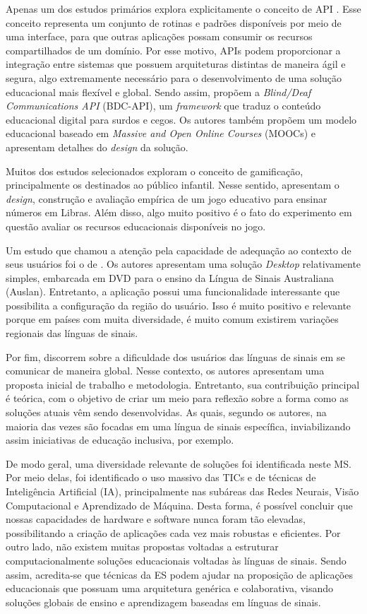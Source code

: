 Apenas um dos estudos primários explora explicitamente o conceito de API \cite{INT56}. Esse conceito representa um conjunto de rotinas e padrões disponíveis por meio de uma interface, para que outras aplicações possam consumir os recursos compartilhados de um domínio. Por esse motivo, APIs podem proporcionar a integração entre sistemas que possuem arquiteturas distintas de maneira ágil e segura, algo extremamente necessário para o desenvolvimento de uma solução educacional mais flexível e global. Sendo assim,  propõem a \textit{Blind/Deaf Communications API} (BDC-API), um \textit{framework} que traduz o conteúdo educacional digital para surdos e cegos. Os autores também propõem um modelo educacional baseado em \textit{Massive and Open Online Courses} (MOOCs) e apresentam detalhes do \textit{design} da solução.

Muitos dos estudos selecionados exploram o conceito de gamificação, principalmente os destinados ao público infantil. Nesse sentido,  apresentam o \textit{design}, construção e avaliação empírica de um jogo educativo para ensinar números em Libras. Além disso, algo muito positivo é o fato do experimento em questão avaliar os recursos educacionais disponíveis no jogo.

Um estudo que chamou a atenção pela capacidade de adequação ao contexto de seus usuários foi o de . Os autores apresentam uma solução \textit{Desktop} relativamente simples, embarcada em DVD para o ensino da Língua de Sinais Australiana (Auslan). Entretanto, a aplicação possui uma funcionalidade interessante que possibilita a configuração da região do usuário. Isso é muito positivo e relevante porque em países com muita diversidade, é muito comum existirem variações regionais das línguas de sinais.

Por fim,  discorrem sobre a dificuldade dos usuários das línguas de sinais em se comunicar de maneira global. Nesse contexto, os autores apresentam uma proposta inicial de trabalho e metodologia. Entretanto, sua contribuição principal é teórica, com o objetivo de criar um meio para reflexão sobre a forma como as soluções atuais vêm sendo desenvolvidas. As quais, segundo os autores, na maioria das vezes são focadas em uma língua de sinais específica, inviabilizando assim iniciativas de educação inclusiva, por exemplo.

De modo geral, uma diversidade relevante de soluções foi identificada neste MS. Por meio delas, foi identificado o uso massivo das TICs e de técnicas de Inteligência Artificial (IA), principalmente nas subáreas das Redes Neurais, Visão Computacional e Aprendizado de Máquina. Desta forma, é possível concluir que nossas capacidades de hardware e software nunca foram tão elevadas, possibilitando a criação de aplicações cada vez mais robustas e eficientes. Por outro lado, não existem muitas propostas voltadas a estruturar computacionalmente soluções educacionais voltadas às línguas de sinais. Sendo assim, acredita-se que técnicas da ES podem ajudar na proposição de aplicações educacionais que possuam uma arquitetura genérica e colaborativa, visando soluções globais de ensino e aprendizagem baseadas em línguas de sinais.

